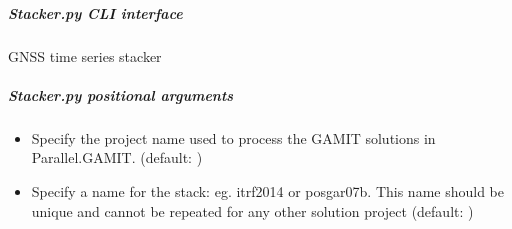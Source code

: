\documentclass[letterpaper,10pt,english]{sphinxmanual}
\begin{document}
\subparagraph{Stacker.py \sphinxhyphen{} CLI interface}
\label{\detokenize{pgamit.com:Stacker.py---CLI-interface}}
\sphinxAtStartPar
GNSS time series stacker

\begin{sphinxVerbatim}[commandchars=\\\{\}]
 \PYG{p}{[}\PYG{p}{]} \PYG{p}{[} \PYG{p}{]} \PYG{p}{[}  \PYG{p}{[} \PYG{p}{]}\PYG{p}{]} \PYG{p}{[} \PYG{p}{]}
           \PYG{p}{[}\PYG{p}{]} \PYG{p}{[}\PYG{p}{]} \PYG{p}{[}  \PYG{p}{[} \PYG{p}{]}\PYG{p}{]}
           \PYG{p}{[} \PYG{p}{]} \PYG{p}{[}\PYG{p}{]}
              
\end{sphinxVerbatim}


\subparagraph{Stacker.py positional arguments}
\label{\detokenize{pgamit.com:Stacker.py-positional-arguments}}\begin{itemize}
\item {} 
\sphinxAtStartPar
{\hyperref[\detokenize{pgamit.com:Stacker.py-_project-name_}]{}} \sphinxhyphen{} Specify the project name used to process the GAMIT solutions in Parallel.GAMIT. (default: )

\item {} 
\sphinxAtStartPar
{\hyperref[\detokenize{pgamit.com:Stacker.py-_stack-name_}]{}} \sphinxhyphen{} Specify a name for the stack: eg. itrf2014 or posgar07b. This name should be unique and cannot be repeated for any other solution project (default: )

\end{itemize}
\end{document}
